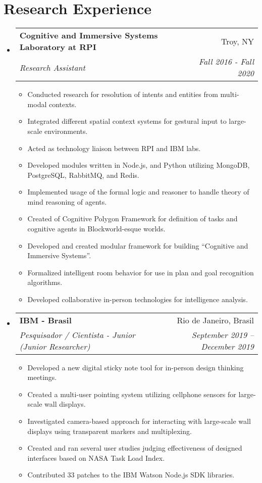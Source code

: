 \documentclass[letterpaper,11pt]{article}
\makeatletter
\newcommand{\resumeItemNew}[1]{
  \item\small{
    {#1 \vspace{-2pt}}
  }
}
\newcommand{\resumeSubheading}[4]{
  \vspace{-1pt}\item
    \begin{tabular*}{0.97\textwidth}{l@{\extracolsep{\fill}}r}
      \textbf{#1} & #2 \\
      \textit{\small #3} & \textit{\small #4} \\
    \end{tabular*}\vspace{-5pt}
}
\newcommand{\resumeSubHeadingListStart}{\begin{itemize}[leftmargin=*]}
\newcommand{\resumeSubHeadingListEnd}{\end{itemize}}
\newcommand{\resumeItemListStart}{\begin{itemize}}
\newcommand{\resumeItemListEnd}{\end{itemize}\vspace{-5pt}}
\makeatother
\begin{document}
\section{Research Experience}
  \resumeSubHeadingListStart
    \resumeSubheading
      {Cognitive and Immersive Systems Laboratory at RPI}{Troy, NY}
      {Research Assistant}{Fall 2016 - Fall 2020}
        \resumeItemListStart
          \resumeItemNew{Conducted research for resolution of intents and entities from multi-modal contexts.}
          \resumeItemNew{Integrated different spatial context systems for gestural input to large-scale environments.}
          \resumeItemNew{Acted as technology liaison between RPI and IBM labs.}
          \resumeItemNew{Developed modules written in Node.js, and Python utilizing MongoDB, PostgreSQL, RabbitMQ, and Redis.}
          \resumeItemNew{Implemented usage of the formal logic and reasoner to handle theory of mind reasoning of agents.}
          \resumeItemNew{Created of Cognitive Polygon Framework for definition of tasks and cognitive agents in Blockworld-esque worlds.}
          \resumeItemNew{Developed and created modular framework for building ``Cognitive and Immersive Systems''.}
          \resumeItemNew{Formalized intelligent room behavior for use in plan and goal recognition algorithms.}
          \resumeItemNew{Developed collaborative in-person technologies for intelligence analysis.}
        \resumeItemListEnd

    \resumeSubheading
      {IBM - Brasil}{Rio de Janeiro, Brasil}
      {Pesquisador / Cientista - Junior (Junior Researcher)}{September 2019 -- December 2019}
      \resumeItemListStart
        \resumeItemNew{Developed a new digital sticky note tool for in-person design thinking meetings.}
        \resumeItemNew{Created a multi-user pointing system utilizing cellphone sensors for large-scale wall displays.}
        \resumeItemNew{Investigated camera-based approach for interacting with large-scale wall displays using transparent markers and multiplexing.}
        \resumeItemNew{Created and ran several user studies judging effectiveness of designed interfaces based on NASA Task Load Index.}
        \resumeItemNew{Contributed 33 patches to the IBM Watson Node.js SDK libraries.}
      \resumeItemListEnd
  \resumeSubHeadingListEnd

\end{document}
